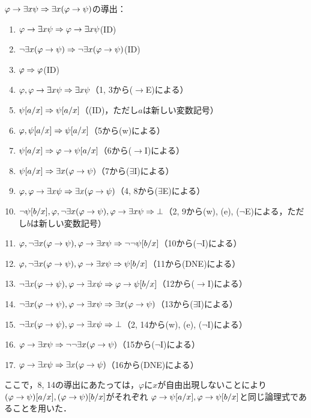 \(\varphi \to \exists x \psi \sequent \exists x \paren{\varphi \to \psi}\)の導出：
\begin{enumerate}
	\item \(\varphi \to \exists x \psi \Rightarrow \varphi \to \exists x \psi\)\quad (ID)
	\item \(\lnot \exists x \paren{\varphi \to \psi} \sequent \lnot \exists x \paren{\varphi \to \psi}\)\quad (ID)
	\item \(\varphi \Rightarrow \varphi\)\quad (ID)
	\item \(\varphi, \varphi \to \exists x \psi \Rightarrow \exists x \psi\)\quad （1, 3から(\(\to\)E)による）
	\item \(\subst{\psi}{a/x} \sequent \subst{\psi}{a/x}\)\quad （(ID)，ただし\(a\)は新しい変数記号）
	\item \(\varphi, \subst{\psi}{a/x} \sequent \subst{\psi}{a/x}\)\quad （5から(w)による）
	\item \(\subst{\psi}{a/x} \sequent \varphi \to \subst{\psi}{a/x}\)\quad （6から(\(\to\)I)による）
	\item \(\subst{\psi}{a/x} \sequent \exists x \paren{\varphi \to \psi}\)\quad （7から(\(\exists\)I)による）
	\item \(\varphi, \varphi \to \exists x \psi \sequent \exists x \paren{\varphi \to \psi}\)\quad （4, 8から(\(\exists\)E)による）
	\item \(\lnot \subst{\psi}{b/x}, \varphi, \lnot \exists x \paren{\varphi \to \psi}, \varphi \to \exists x \psi \sequent \bot\)\quad （2, 9から(w), (e), (\(\lnot\)E)による，ただし\(b\)は新しい変数記号）
	\item \(\varphi, \lnot \exists x \paren{\varphi \to \psi}, \varphi \to \exists x \psi \sequent \lnot \lnot \subst{\psi}{b/x}\)\quad （10から(\(\lnot\)I)による）
	\item \(\varphi, \lnot \exists x \paren{\varphi \to \psi}, \varphi \to \exists x \psi \sequent \subst{\psi}{b/x}\)\quad （11から(DNE)による）
	\item \(\lnot \exists x \paren{\varphi \to \psi}, \varphi \to \exists x \psi \sequent \varphi \to \subst{\psi}{b/x}\)\quad （12から(\(\to\)I)による）
	\item \(\lnot \exists x \paren{\varphi \to \psi}, \varphi \to \exists x \psi \sequent \exists x \paren{\varphi \to \psi}\)\quad （13から(\(\exists\)I)による）
	\item \(\lnot \exists x \paren{\varphi \to \psi}, \varphi \to \exists x \psi \sequent \bot\)\quad （2, 14から(w), (e), (\(\lnot\)I)による）
	\item \(\varphi \to \exists x \psi \sequent \lnot \lnot \exists x \paren{\varphi \to \psi}\)\quad （15から(\(\lnot\)I)による）
	\item \(\varphi \to \exists x \psi \sequent \exists x \paren{\varphi \to \psi}\)\quad （16から(DNE)による）
\end{enumerate}
ここで，8, 14の導出にあたっては，\(\varphi\)に\(x\)が自由出現しないことにより
\(\subst{\paren{\varphi \to \psi}}{a/x}, \subst{\paren{\varphi \to \psi}}{b/x}\)がそれぞれ
\(\varphi \to \subst{\psi}{a/x}, \varphi \to \subst{\psi}{b/x}\)と同じ論理式であることを用いた．

